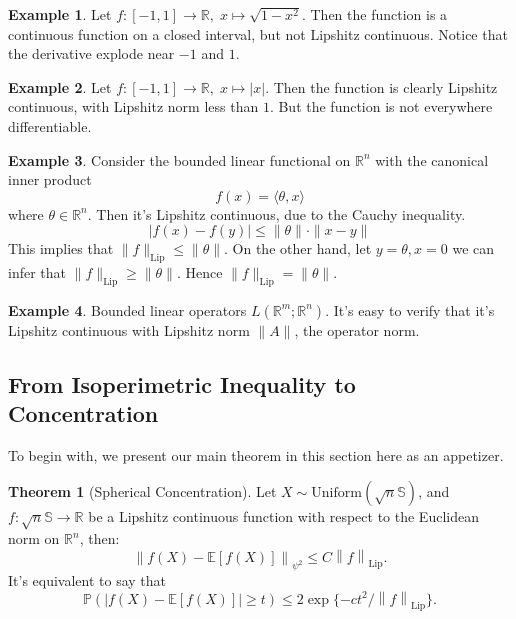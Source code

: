 \documentclass[9pt,onesided]{article}
\newcommand{\nm}[1]{\left\lVert#1\right\rVert}
\newcommand{\re}{\mathbb{R}}
\newcommand{\ex}[1]{\mathbb{E}[#1]}
\newcommand{\mc}{\color{BlueViolet}}
\renewcommand{\ge}{\geqslant}
\renewcommand{\le}{\leqslant}
\newcommand{\s}{\mathbb{S}}
\newcommand{\p}{\mathbb{P}}
\theoremstyle{definition}
\newtheorem*{example}{\mc Example}
\newtheorem{theorem}{\mc Theorem}
\begin{document}
\begin{example}
    Let $f:[-1,1]\to \re, \;x\mapsto\sqrt{1-x^2}$. Then the function is a continuous function on a closed interval, but not Lipshitz continuous. Notice that the derivative explode near $-1$ and $1$.
\end{example}

\begin{example}
    Let $f: [-1,1]\to \re, \; x\mapsto |x|$. Then the function is clearly Lipshitz continuous, with Lipshitz norm less than $1$. But the function is not everywhere differentiable.
\end{example}

\begin{example}
    Consider the bounded linear functional on $\re^n$ with the canonical inner product
    \begin{equation*}
        f(x)=\langle \theta,x\rangle
    \end{equation*}
    where $\theta \in \re^n$. Then it's Lipshitz continuous, due to the Cauchy inequality. 
    \begin{equation*}
        |f(x)-f(y)|\le \|\theta\| \cdot \|x-y\|
    \end{equation*}
    This implies that $\|f\|_{\mathrm{Lip}}\le \|\theta\|$. On the other hand, let $y=\theta,x=0$ we can infer that $\|f\|_{\mathrm{Lip}}\ge \|\theta\|$. Hence $\|f\|_{\mathrm{Lip}}=\|\theta\|$. 
\end{example}

\begin{example}
    Bounded linear operators $L(\re^m;\re^n)$. It's easy to verify that it's Lipshitz continuous with Lipshitz norm $\|A\|$, the operator norm. 
\end{example}

\subsection{From Isoperimetric Inequality to Concentration}

To begin with, we present our main theorem in this section here as an appetizer.

\begin{theorem}
    [Spherical Concentration] Let $X\sim \mathrm{Uniform}(\sqrt{n}\s)$, and $f: \sqrt{n}\s\to \re$ be a Lipshitz continuous function with respect to the Euclidean norm on $\re^n$, then:
    \begin{equation}
        \left\| f(X)- \ex{f(X)}\right\|_{\psi^2}\le C \nm{f}_{\mathrm{Lip}}.
    \end{equation}
    It's equivalent to say that
    \begin{equation}
        \p \left(\left| f(X)-\ex{f(X)}\right|\ge t\right)\le 2 \exp \{-ct^2/\nm{f}_{\mathrm{Lip}}\}.
    \end{equation}
\end{theorem}
\end{document}
